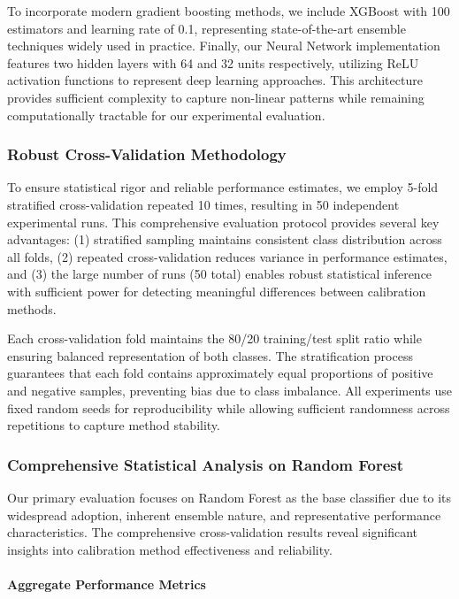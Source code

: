 \documentclass[12pt, a4paper]{article}
\begin{document}
To incorporate modern gradient boosting methods, we include XGBoost with 100 estimators and learning rate of 0.1, representing state-of-the-art ensemble techniques widely used in practice. Finally, our Neural Network implementation features two hidden layers with 64 and 32 units respectively, utilizing ReLU activation functions to represent deep learning approaches. This architecture provides sufficient complexity to capture non-linear patterns while remaining computationally tractable for our experimental evaluation.

\subsubsection{Robust Cross-Validation Methodology}

To ensure statistical rigor and reliable performance estimates, we employ 5-fold stratified cross-validation repeated 10 times, resulting in 50 independent experimental runs. This comprehensive evaluation protocol provides several key advantages: (1) stratified sampling maintains consistent class distribution across all folds, (2) repeated cross-validation reduces variance in performance estimates, and (3) the large number of runs (50 total) enables robust statistical inference with sufficient power for detecting meaningful differences between calibration methods.

Each cross-validation fold maintains the 80/20 training/test split ratio while ensuring balanced representation of both classes. The stratification process guarantees that each fold contains approximately equal proportions of positive and negative samples, preventing bias due to class imbalance. All experiments use fixed random seeds for reproducibility while allowing sufficient randomness across repetitions to capture method stability.

\subsubsection{Comprehensive Statistical Analysis on Random Forest}

Our primary evaluation focuses on Random Forest as the base classifier due to its widespread adoption, inherent ensemble nature, and representative performance characteristics. The comprehensive cross-validation results reveal significant insights into calibration method effectiveness and reliability.

\paragraph{Aggregate Performance Metrics}
\end{document}
